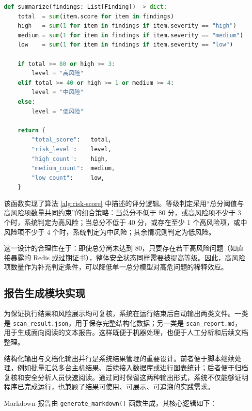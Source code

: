 \documentclass[12pt,a4paper,fontset=none]{ctexart}
\begin{document}
\begin{lstlisting}[language=Python,caption={风险汇总与等级判定模块}]
def summarize(findings: List[Finding]) -> dict:
    total  = sum(item.score for item in findings)
    high   = sum(1 for item in findings if item.severity == "high")
    medium = sum(1 for item in findings if item.severity == "medium")
    low    = sum(1 for item in findings if item.severity == "low")

    if total >= 80 or high >= 3:
        level = "高风险"
    elif total >= 40 or high >= 1 or medium >= 4:
        level = "中风险"
    else:
        level = "低风险"

    return {
        "total_score":   total,
        "risk_level":    level,
        "high_count":    high,
        "medium_count":  medium,
        "low_count":     low,
    }
\end{lstlisting}

该函数实现了算法 \ref{alg:risk-score} 中描述的评分逻辑。等级判定采用“总分阈值与高风险项数量共同约束”的组合策略：当总分不低于 80 分，或高风险项不少于 3 个时，系统判定为高风险；当总分不低于 40 分，或存在至少 1 个高风险项，或中风险项不少于 4 个时，系统判定为中风险；其余情况则判定为低风险。

这一设计的合理性在于：即使总分尚未达到 80，只要存在若干高风险问题（如直接暴露的 Redis 或过期证书），整体安全状态同样需要被提高等级。因此，高风险项数量作为补充判定条件，可以降低单一总分模型对高危问题的稀释效应。

\subsection{报告生成模块实现}

为保证执行结果和风险展示均可复核，系统在运行结束后自动输出两类文件。一类是 \texttt{scan\_result.json}，用于保存完整结构化数据；另一类是 \texttt{scan\_report.md}，用于生成面向阅读的文本报告。这样既便于机器处理，也便于人工分析和后续文档整理。

结构化输出与文档化输出并行是系统结果管理的重要设计。前者便于脚本继续处理，例如批量汇总多台主机结果、后续接入数据库或进行图表统计；后者便于归档复核和安全分析人员快速阅读。通过同时保留这两种输出形式，系统不仅能够证明程序已完成运行，也兼顾了结果可使用、可展示、可追溯的实践需求。

Markdown 报告由 \texttt{generate\_markdown()} 函数生成，其核心逻辑如下：
\end{document}
